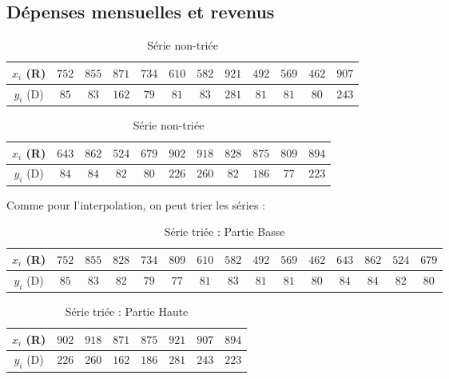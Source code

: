 \documentclass{report}
\begin{document}
      \subsection{Dépenses mensuelles et revenus}
	\begin{table}[h]
	  \begin{tabular}{| c | c | c | c | c | c | c | c | c | c | c | c |}
	    \hline 
	    $x_{i}$ (R) & $752$ & $855$ & $871$ & $734$ & $610$ & $582$ & $921$ & $492$ & $569$ & $462$ & $907 $ \\ 
	    \hline 
	    $y_{i}$ (D) & $85$ & $83$ & $162$ & $79$ & $81$ & $83$ & $281$ & $81$ & $81$ & $80$ & $243 $ \\ 
	    \hline 
	  \end{tabular}
	  \newline
	  \begin{tabular}{| c | c | c | c | c | c | c | c | c | c | c |}
	    \hline 
	    $x_{i}$ (R) & $643$ & $862$ & $524$ & $679$ & $902$ & $918$ & $828$ & $875$ & $809$ & $894$ \\ 
	    \hline 
	    $y_{i}$ (D) & $84$ & $84$ & $82$ & $80$ & $226$ & $260$ & $82$ & $186$ & $77$ & $223$ \\ 
	    \hline 
	  \end{tabular}
	  \caption{Série non-triée}
	  \label{approx_tp2_ex3_depenses}
	\end{table}
	
	Comme pour l'interpolation, on peut trier les séries :
	
	\begin{table}[h]
	  \centering
	  \begin{tabular}{| c | c | c | c | c | c | c | c | c | c | c | c | c | c | c |}
	    \hline 
	    $x_{i}$ (R) & $752$ & $855$ & $828$ & $734$ & $809$ & $610$ & $582$ & $492$ & $569$ & $462$ & $643$ & $862$ & $524$ & $679$ \\ 
	    \hline 
	    $y_{i}$ (D) & $85$ & $83$ & $82$ & $79$ & $77$ & $81$ & $83$ & $81$ & $81$ & $80$ & $84$ & $84$ & $82$ & $80$ \\ 
	    \hline 
	  \end{tabular}
	  \caption{Série triée : Partie Basse}
	  \label{approx_tp2_ex3_depenses_bas}
	\end{table}
	\begin{table}[h]
	  \centering
	  \begin{tabular}{| c | c | c | c | c | c | c | c |}
	    \hline 
	    $x_{i}$ (R) & $902$ & $918$ & $871$ & $875$ & $921$ & $907$ & $894$ \\ 
	    \hline 
	    $y_{i}$ (D) & $226$ & $260$ & $162$ & $186$ & $281$ & $243$ & $223$ \\ 
	    \hline 
	  \end{tabular}
	  \caption{Série triée : Partie Haute}
	  \label{approx_tp2_ex3_depenses_haut}
	\end{table}
	
\end{document}

